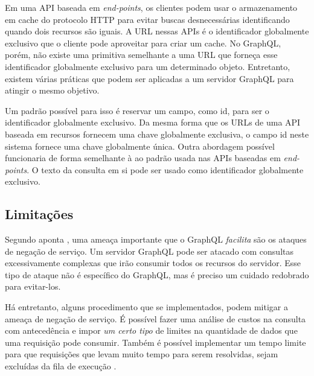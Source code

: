 Em uma API baseada em \textit{end-points}, os clientes podem usar o armazenamento em cache do protocolo HTTP para evitar buscas desnecessárias identificando quando dois recursos são iguais. A URL nessas APIs é o identificador globalmente exclusivo que o cliente pode aproveitar para criar um cache. No GraphQL, porém, não existe uma primitiva semelhante a uma URL que forneça esse identificador globalmente exclusivo para um determinado objeto. Entretanto, existem várias práticas que podem ser aplicadas a um servidor GraphQL para atingir o mesmo objetivo.

Um padrão possível para isso é reservar um campo, como id, para ser o identificador globalmente exclusivo. Da mesma forma que os URLs de uma API baseada em recursos fornecem uma chave globalmente exclusiva, o campo id neste sistema fornece uma chave globalmente única. Outra abordagem possível funcionaria de forma semelhante à ao padrão usada nas APIs baseadas em \textit{end-points}. O texto da consulta em si pode ser usado como identificador globalmente exclusivo. 


\subsection{Limitações}

Segundo aponta , uma ameaça importante que o GraphQL \emph{facilita} são os ataques de negação de serviço. Um servidor GraphQL pode ser atacado com consultas excessivamente complexas que irão consumir todos os recursos do servidor. Esse tipo de ataque não é específico do GraphQL, mas é preciso um cuidado redobrado para evitar-los.

Há entretanto, alguns procedimento que se implementados, podem mitigar a ameaça de negação de serviço. É possível fazer uma análise de custos na consulta com antecedência e impor \emph{um certo tipo} de limites na quantidade de dados que uma requisição pode consumir. Também é possível implementar um tempo limite para que requisições que levam muito tempo para serem resolvidas, sejam excluídas da fila de execução .


